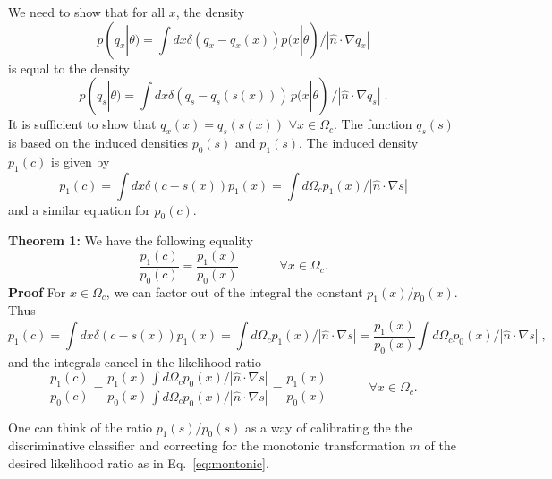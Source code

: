 \documentclass[aoas,preprint]{imsart}
\numberwithin{equation}{section}
\theoremstyle{plain}
\begin{document}
We need to show that for all $x$, the density
\begin{equation}
p(q_x|\theta) = \int dx \delta(q_x-q_x(x)) p(x|\theta)  / | \hat{n} \cdot \nabla q_x  | 
\end{equation}
is equal to the density
\begin{equation}
p(q_s|\theta) = \int dx \delta(q_s-q_s(s(x))) \, p(x|\theta) \, / | \hat{n} \cdot \nabla q_s  | \; .
\end{equation}
It is sufficient to show that $q_x(x) = q_s(s(x))$ $ \forall x\in\Omega_c$. The function $q_s(s)$ is based on the induced densities $p_0(s)$ and $p_1(s)$.  The induced density $p_1(c)$ is given by 
\begin{equation}
p_1(c) = \int dx \delta(c-s(x)) p_1(x) = \int d\Omega_c p_1(x)  / | \hat{n} \cdot \nabla s  |
\end{equation}
and a similar equation for $p_0(c)$. 

\textbf{\flushleft Theorem 1:}
We have the following equality
\begin{equation}
\frac{p_1(c)}{p_0(c)} =  \frac{p_1(x)}{p_0(x)}  \;\hspace{3em} \forall x\in\Omega_c.
\end{equation}
\textbf{Proof}
For $x\in \Omega_c$, we can factor out of the integral the constant $p_1(x)/p_0(x)$.
Thus
\begin{equation}
p_1(c) = \int dx \delta(c-s(x)) p_1(x) = \int d\Omega_c p_1(x) / | \hat{n} \cdot \nabla s  |= \frac{p_1(x)}{p_0(x)} \int d\Omega_c p_0(x)  / | \hat{n} \cdot \nabla s  | \;,
\end{equation}
and the integrals cancel in the likelihood ratio
\begin{equation}
\frac{p_1(c)}{p_0(c)} = \frac{p_1(x)}{p_0(x)} \frac{\int d\Omega_c p_0(x)/ | \hat{n} \cdot \nabla s  |}{ \int d\Omega_c p_0(x) / | \hat{n} \cdot \nabla s  |} = \frac{p_1(x)}{p_0(x)}  \;\hspace{3em} \forall x\in\Omega_c.
\end{equation}

One can think of the ratio $p_1(s)/p_0(s)$ as a way of calibrating the the discriminative classifier and correcting for the monotonic transformation $m$ of the desired likelihood ratio as in Eq.~\ref{eq:montonic}.

\end{document}

